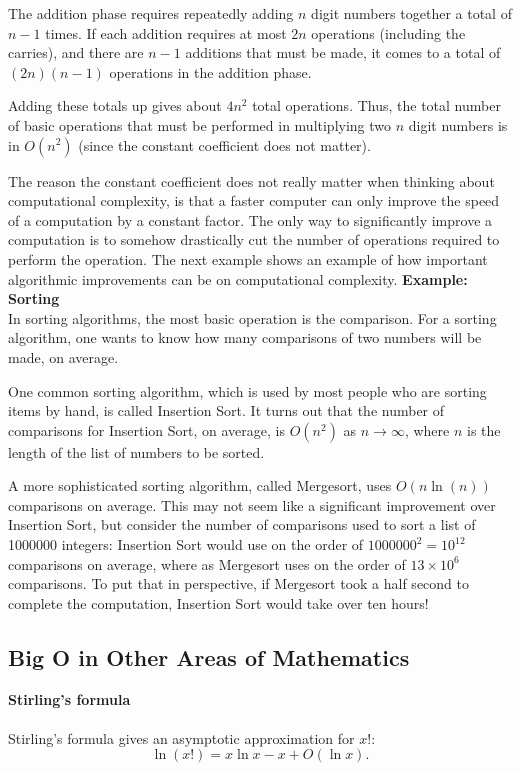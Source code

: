 \documentclass[a4paper]{book}
\begin{document}
\begin{sloppypar}
The addition phase requires repeatedly adding $n$ digit numbers together a total of $n-1$ times. If each addition requires at most $2n$ operations (including the carries), and there are $n-1$ additions that must be made, it comes to a total of $(2n)(n-1)$ operations in the addition phase.

Adding these totals up gives about $4n^2$ total operations. Thus, the total number of basic operations that must be performed in multiplying two $n$ digit numbers is in $O(n^2)$ (since the constant coefficient does not matter).

The reason the constant coefficient does not really matter when thinking about computational complexity, is that a faster computer can only improve the speed of a computation by a constant factor. The only way to significantly improve a computation is to somehow drastically cut the number of operations required to perform the operation. The next example shows an example of how important algorithmic improvements can be on computational complexity.
\bigbreak
\noindent \textbf{Example: Sorting}\\

In sorting algorithms, the most basic operation is the comparison. For a sorting algorithm, one wants to know how many comparisons of two numbers will be made, on average.

One common sorting algorithm, which is used by most people who are sorting items by hand, is called Insertion Sort. It turns out that the number of comparisons for Insertion Sort, on average, is $O(n^2)$ as $n \rightarrow \infty$, where $n$ is the length of the list of numbers to be sorted.

A more sophisticated sorting algorithm, called Mergesort, uses $O(n\ln(n))$ comparisons on average. This may not seem like a significant improvement over Insertion Sort, but consider the number of comparisons used to sort a list of 1000000 integers: Insertion Sort would use on the order of $1000000^2 = 10^{12}$ comparisons on average, where as Mergesort uses on the order of $13 \times 10^6$ comparisons. To put that in perspective, if Mergesort took a half second to complete the computation, Insertion Sort would take over ten hours!

\subsection{Big O in Other Areas of Mathematics}
\bigbreak
\noindent \textbf{Stirling's formula}\\\\
Stirling's formula gives an asymptotic approximation for $x!$: \[ \ln (x!) = x \ln x - x + O(\ln x). \]


\end{sloppypar}
\end{document}
